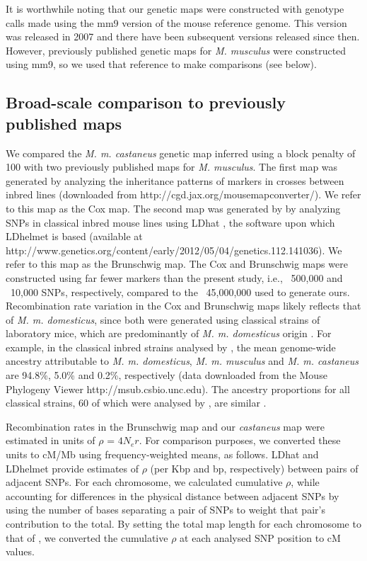 It is worthwhile noting that our genetic maps were constructed with genotype calls made using the mm9 version of the mouse reference genome. This version was released in 2007 and there have been subsequent versions released since then. However, previously published genetic maps for \textit{M. musculus} were constructed using mm9, so we used that reference to make comparisons (see below).
 
\subsection{Broad-scale comparison to previously published maps}
 
We compared the \textit{M. m. castaneus} genetic map inferred using a block penalty of 100 with two previously published maps for \textit{M. musculus}. The first map was generated by analyzing the inheritance patterns of markers in crosses between inbred lines \citep{RN232} (downloaded from http://cgd.jax.org/mousemapconverter/). We refer to this map as the Cox map. The second map was generated by \cite{RN146} by analyzing SNPs in classical inbred mouse lines using LDhat \citep{RN260}, the software upon which LDhelmet is based (available at http://www.genetics.org/content/early/2012/05/04/genetics.112.141036). We refer to this map as the Brunschwig map. The Cox and Brunschwig maps were constructed using far fewer markers than the present study, i.e., ~500,000 and ~10,000 SNPs, respectively, compared to the ~45,000,000 used to generate ours. Recombination rate variation in the Cox and Brunschwig maps likely reflects that of \textit{M. m. domesticus}, since both were generated using classical strains of laboratory mice, which are predominantly of \textit{M. m. domesticus} origin \citep{RN243}. For example, in the classical inbred strains analysed by \cite{RN213}, the mean genome-wide ancestry attributable to \textit{M. m. domesticus}, \textit{M. m. musculus} and \textit{M. m. castaneus} are 94.8\%, 5.0\% and 0.2\%, respectively (data downloaded from the Mouse Phylogeny Viewer \citep{RN280} http://msub.csbio.unc.edu). The ancestry proportions for all classical strains, 60 of which were analysed by \cite{RN156}, are similar \citep{RN243}.

Recombination rates in the Brunschwig map and our \textit{castaneus} map were estimated in units of $\rho$ = $4N_er$. For comparison purposes, we converted these units to cM/Mb using frequency-weighted means, as follows. LDhat and LDhelmet provide estimates of $\rho$ (per Kbp and bp, respectively) between pairs of adjacent SNPs. For each chromosome, we calculated cumulative $\rho$, while accounting for differences in the physical distance between adjacent SNPs by using the number of bases separating a pair of SNPs to weight that pair’s contribution to the total. By setting the total map length for each chromosome to that of \cite{RN232}, we converted the cumulative $\rho$ at each analysed SNP position to cM values.
 
